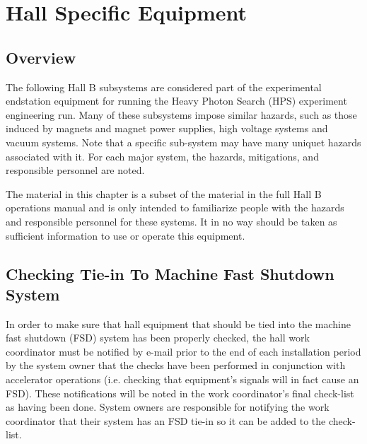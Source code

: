 %
%
\chapter{Hall Specific Equipment}

\section{Overview}


The following Hall B subsystems are considered part of the experimental endstation equipment for running the Heavy Photon Search (HPS) experiment engineering run.
Many of these subsystems impose similar hazards, such as those induced by magnets and magnet power supplies,
high voltage systems and vacuum systems.  Note that a specific sub-system may have many uniquet hazards associated with it.
For each major system, the hazards, mitigations, and responsible personnel are noted.

The material in this chapter is a subset of the material in the full Hall B operations manual and is only intended to familiarize
people with the hazards and responsible personnel for these systems.  It in no way should be taken as sufficient information to use or operate this equipment.

\section{Checking Tie-in To Machine Fast Shutdown System}

In order to make sure that hall equipment that should be tied into the machine fast shutdown (FSD) system
has been properly checked, the hall work coordinator must be notified by e-mail prior to the end of each
installation period by the system owner
that the checks have been performed in conjunction with accelerator operations (i.e. checking that equipment's signals
will in fact cause an FSD).  These notifications will be
noted in the work coordinator's final check-list as having been done.   System owners are responsible
for notifying the work coordinator that their system has an FSD tie-in so it can be added to the check-list.


%
%
